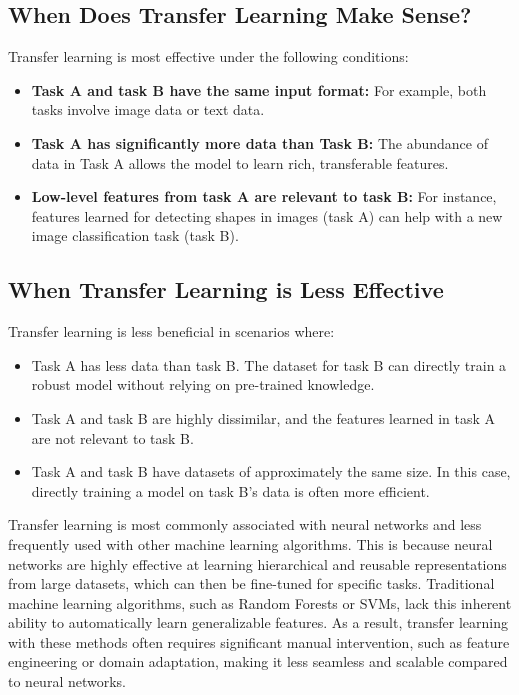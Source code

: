 \documentclass[12pt,openany]{book}
\begin{document}
\subsection{When Does Transfer Learning Make Sense?}

Transfer learning is most effective under the following conditions:
\begin{itemize}
    \item \textbf{Task A and task B have the same input format:} For example, both tasks involve image data or text data.
    \item \textbf{Task A has significantly more data than Task B:} The abundance of data in Task A allows the model to learn rich, transferable features.
    \item \textbf{Low-level features from task A are relevant to task B:} For instance, features learned for detecting shapes in images (task A) can help with a new image classification task (task B).
\end{itemize}


\subsection{When Transfer Learning is Less Effective}

Transfer learning is less beneficial in scenarios where:
\begin{itemize}
    \item Task A has less data than task B. The dataset for task B can directly train a robust model without relying on pre-trained knowledge.
    \item Task A and task B are highly dissimilar, and the features learned in task A are not relevant to task B.
    \item Task A and task B have datasets of approximately the same size. In this case, directly training a model on task B’s data is often more efficient.
\end{itemize}

\vspace{0.5cm}

\begin{notebox}
Transfer learning is most commonly associated with neural networks and less frequently used with other machine learning algorithms. This is because neural networks are highly effective at learning hierarchical and reusable representations from large datasets, which can then be fine-tuned for specific tasks. Traditional machine learning algorithms, such as Random Forests or SVMs, lack this inherent ability to automatically learn generalizable features. As a result, transfer learning with these methods often requires significant manual intervention, such as feature engineering or domain adaptation, making it less seamless and scalable compared to neural networks.
\end{notebox}
\end{document}
